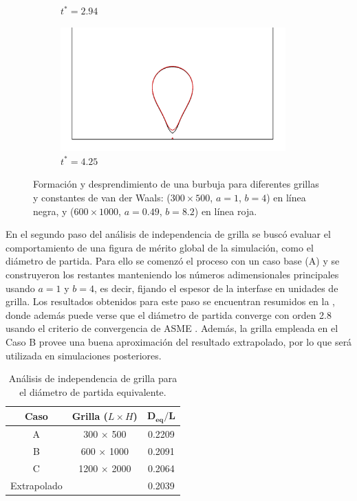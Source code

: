 \begin{figure}[htb]
\begin{subfigure}[t]{0.45\textwidth}
        \caption{$t^* = 2.94$}
    \end{subfigure}    
    \begin{subfigure}[t]{0.45\textwidth}
        \centering
        \includegraphics[width=0.95\textwidth]{Imagenes/HetBoiling/GridIndep_1/130}
        \caption{$t^* = 4.25$}
    \end{subfigure}    
    \caption{Formaci\'on y desprendimiento de una burbuja para diferentes grillas y constantes de van der Waals: ($300 \times 500$, $a=1$, $b=4$) en l\'inea negra, y ($600 \times 1000$, $a=0.49$, $b=8.2$) en l\'inea roja.}
    \label{fig:bubble2D_step1}
\end{figure}

En el segundo paso del an\'alisis de independencia de grilla se busc\'o evaluar el comportamiento de una figura de m\'erito global de la simulaci\'on, como el di\'ametro de partida. Para ello se comenz\'o el proceso con un caso base (A) y se construyeron los restantes manteniendo los n\'umeros adimensionales principales usando $a=1$ y $b=4$, es decir, fijando el espesor de la interfase en unidades de grilla. Los resultados obtenidos para este paso se encuentran resumidos en la , donde adem\'as puede verse que el di\'ametro de partida converge con orden 2.8 usando el criterio de convergencia de ASME \cite{freitas_asmes_2003}. Adem\'as, la grilla empleada en el Caso B provee una buena aproximaci\'on del resultado extrapolado, por lo que ser\'a utilizada en simulaciones posteriores.

\begin{table}[ht]
	\centering
    \begin{tabular}{c c c}
	    \toprule
        \bf Caso & \bf Grilla ($L\times H$) & $\bm{D_{eq}/L}$  \\
        \midrule
		A & 300  $\times$ 500  &  0.2209 \\
		B & 600  $\times$ 1000 &  0.2091 \\		
		C & 1200 $\times$ 2000 &  0.2064 \\		
		Extrapolado &          &  0.2039 \\		
        \bottomrule
	\end{tabular}
	\caption{An\'alisis de independencia de grilla para el di\'ametro de partida equivalente.}
	\label{tab:gridindep_step2}
\end{table} 


